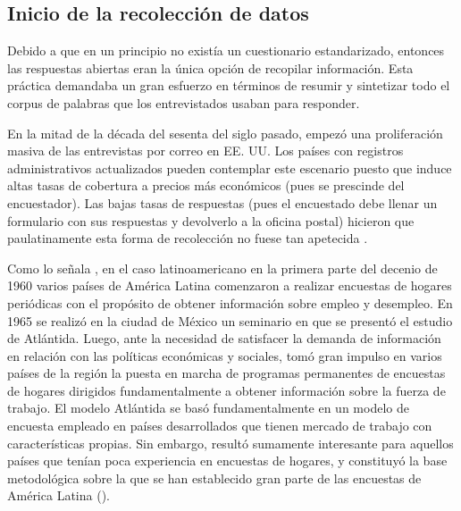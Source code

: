 \documentclass[
  12pt,
]{book}
\begin{document}
\hypertarget{inicio-de-la-recolecciuxf3n-de-datos}{%
\subsection{Inicio de la recolección de datos}\label{inicio-de-la-recolecciuxf3n-de-datos}}

Debido a que en un principio no existía un cuestionario estandarizado, entonces las respuestas abiertas eran la única opción de recopilar información. Esta práctica demandaba un gran esfuerzo en términos de resumir y sintetizar todo el corpus de palabras que los entrevistados usaban para responder.

En la mitad de la década del sesenta del siglo pasado, empezó una proliferación masiva de las entrevistas por correo en EE. UU. Los países con registros administrativos actualizados pueden contemplar este escenario puesto que induce altas tasas de cobertura a precios más económicos (pues se prescinde del encuestador). Las bajas tasas de respuestas (pues el encuestado debe llenar un formulario con sus respuestas y devolverlo a la oficina postal) hicieron que paulatinamente esta forma de recolección no fuese tan apetecida \citep{Groves_Fowler_Couper_Lepkowski_Singer_Tourangeau_2009}.

Como lo señala \citet{CEPALcuadernos}, en el caso latinoamericano en la primera parte del decenio de 1960 varios países de América Latina comenzaron a realizar encuestas de hogares periódicas con el propósito de obtener información sobre empleo y desempleo. En 1965 se realizó en la ciudad de México un seminario en que se presentó el estudio de Atlántida. Luego, ante la necesidad de satisfacer la demanda de información en relación con las políticas económicas y sociales, tomó gran impulso en varios países de la región la puesta en marcha de programas permanentes de encuestas de hogares dirigidos fundamentalmente a obtener información sobre la fuerza de trabajo. El modelo Atlántida se basó fundamentalmente en un modelo de encuesta empleado en países desarrollados que tienen mercado de trabajo con características propias. Sin embargo, resultó sumamente interesante para aquellos países que tenían poca experiencia en encuestas de hogares, y constituyó la base metodológica sobre la que se han establecido gran parte de las encuestas
de América Latina (\citet{CEPALcuadernos}).
\end{document}
